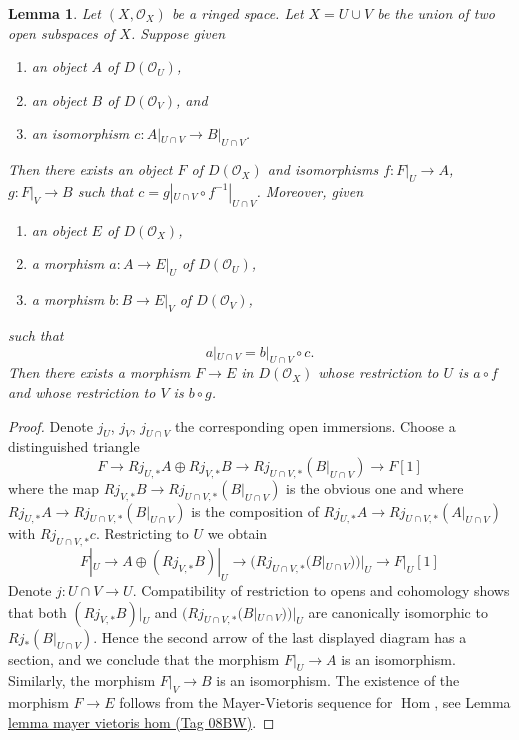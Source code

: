 \documentclass{amsart}
\theoremstyle{plain}
\newtheorem{lemma}[subsection]{Lemma}
\theoremstyle{definition}
\theoremstyle{remark}
\numberwithin{equation}{subsection}
\def\Hom{\mathop{\mathrm{Hom}}\nolimits}
\begin{document}
\begin{lemma}
\label{cohomology-lemma-glue}
Let $(X, \mathcal{O}_X)$ be a ringed space. Let $X = U \cup V$ be
the union of two open subspaces of $X$. Suppose given
\begin{enumerate}
\item an object $A$ of $D(\mathcal{O}_U)$,
\item an object $B$ of $D(\mathcal{O}_V)$, and
\item an isomorphism $c : A|_{U \cap V} \to B|_{U \cap V}$.
\end{enumerate}
Then there exists an object $F$ of $D(\mathcal{O}_X)$
and isomorphisms $f : F|_U \to A$, $g : F|_V \to B$ such
that $c = g|_{U \cap V} \circ f^{-1}|_{U \cap V}$.
Moreover, given
\begin{enumerate}
\item an object $E$ of $D(\mathcal{O}_X)$,
\item a morphism $a : A \to E|_U$ of $D(\mathcal{O}_U)$,
\item a morphism $b : B \to E|_V$ of $D(\mathcal{O}_V)$, 
\end{enumerate}
such that
$$
a|_{U \cap V}  = b|_{U \cap V} \circ c.
$$
Then there exists a morphism $F \to E$ in $D(\mathcal{O}_X)$
whose restriction to $U$ is $a \circ f$
and whose restriction to $V$ is $b \circ g$.
\end{lemma}

\begin{proof}
Denote $j_U$, $j_V$, $j_{U \cap V}$ the corresponding open immersions.
Choose a distinguished triangle
$$
F \to Rj_{U, *}A \oplus Rj_{V, *}B \to Rj_{U \cap V, *}(B|_{U \cap V})
\to F[1]
$$
where the map $Rj_{V, *}B \to Rj_{U \cap V, *}(B|_{U \cap V})$ is the
obvious one and where
$Rj_{U, *}A \to Rj_{U \cap V, *}(B|_{U \cap V})$
is the composition of
$Rj_{U, *}A \to Rj_{U \cap V, *}(A|_{U \cap V})$
with $Rj_{U \cap V, *}c$. Restricting to $U$ we obtain
$$
F|_U \to A \oplus (Rj_{V, *}B)|_U \to (Rj_{U \cap V, *}(B|_{U \cap V}))|_U
\to F|_U[1]
$$
Denote $j : U \cap V \to U$. Compatibility of restriction to opens and
cohomology shows that both
$(Rj_{V, *}B)|_U$ and $(Rj_{U \cap V, *}(B|_{U \cap V}))|_U$
are canonically isomorphic to $Rj_*(B|_{U \cap V})$.
Hence the second arrow of the last displayed diagram has
a section, and we conclude that the morphism $F|_U \to A$ is
an isomorphism. Similarly, the morphism $F|_V \to B$ is an
isomorphism. The existence of the morphism $F \to E$ follows
from the Mayer-Vietoris sequence for $\Hom$, see
Lemma \href{https://stacks.math.columbia.edu/tag/08BW}{lemma mayer vietoris hom (Tag 08BW)}.
\end{proof}
\end{document}
